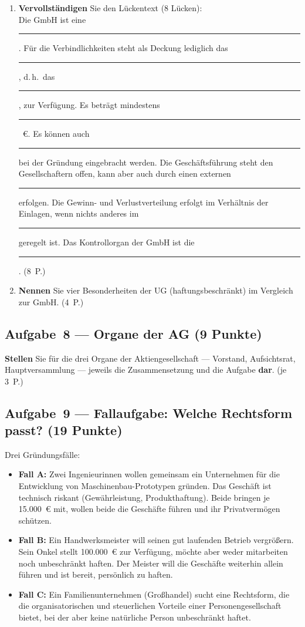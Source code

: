 \documentclass[11pt, a4paper]{article}
\begin{document}
\begin{enumerate}[label=(\alph*)]
  \item \textbf{Vervollständigen} Sie den Lückentext (8 Lücken):\\[0.3em]
    Die GmbH ist eine \rule{3cm}{0.4pt}. Für die Verbindlichkeiten steht als Deckung
    lediglich das \rule{3cm}{0.4pt}, d.\,h.\ das \rule{3cm}{0.4pt}, zur Verfügung. Es
    beträgt mindestens \rule{2cm}{0.4pt}~€. Es können auch \rule{3cm}{0.4pt} bei der
    Gründung eingebracht werden. Die Geschäftsführung steht den Gesellschaftern offen,
    kann aber auch durch einen externen \rule{3cm}{0.4pt} erfolgen. Die Gewinn- und
    Verlustverteilung erfolgt im Verhältnis der Einlagen, wenn nichts anderes im
    \rule{3cm}{0.4pt} geregelt ist. Das Kontrollorgan der GmbH ist die
    \rule{3.6cm}{0.4pt}. \hfill (8~P.)
  \item \textbf{Nennen} Sie vier Besonderheiten der UG (haftungsbeschränkt) im Vergleich
    zur GmbH. \hfill (4~P.)
\end{enumerate}

\subsection*{Aufgabe~8 --- Organe der AG (9 Punkte)}

\textbf{Stellen} Sie für die drei Organe der Aktiengesellschaft --- Vorstand,
Aufsichtsrat, Hauptversammlung --- jeweils die Zusammensetzung und die Aufgabe
\textbf{dar}. \hfill (je 3~P.)

\subsection*{Aufgabe~9 --- Fallaufgabe: Welche Rechtsform passt? (19 Punkte)}

Drei Gründungsfälle:

\begin{itemize}
  \item \textbf{Fall A:} Zwei Ingenieurinnen wollen gemeinsam ein Unternehmen für die
    Entwicklung von Maschinenbau-Prototypen gründen. Das Geschäft ist technisch riskant
    (Gewährleistung, Produkthaftung). Beide bringen je 15.000~€ mit, wollen beide die
    Geschäfte führen und ihr Privatvermögen schützen.
  \item \textbf{Fall B:} Ein Handwerksmeister will seinen gut laufenden Betrieb
    vergrößern. Sein Onkel stellt 100.000~€ zur Verfügung, möchte aber weder mitarbeiten
    noch unbeschränkt haften. Der Meister will die Geschäfte weiterhin allein führen und
    ist bereit, persönlich zu haften.
  \item \textbf{Fall C:} Ein Familienunternehmen (Großhandel) sucht eine Rechtsform, die
    die organisatorischen und steuerlichen Vorteile einer Personengesellschaft bietet,
    bei der aber keine natürliche Person unbeschränkt haftet.
\end{itemize}
\end{document}
